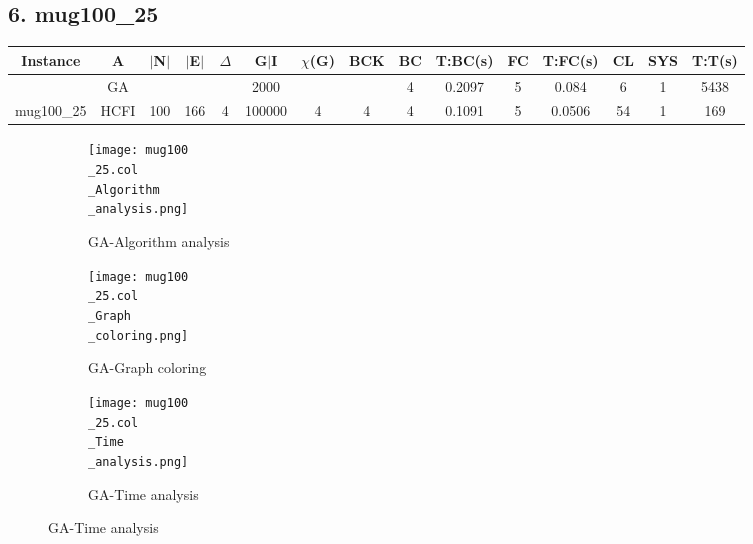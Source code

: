 \documentclass[10pt]{article}
\begin{document}
\subsection*{\hspace{0,9073976cm} 6. mug100\_25}
\begin{table}[H]
\centering
\begin{tabular}{|c|c|c|c|c|c|c|c|c|c|c|c|c|c|c|}
\hline
Instance& A &$|$N$|$ & $|$E$|$ & $\Delta$ & G$|$I & $\chi$(G) &BCK&BC & T:BC(s) & FC & T:FC(s) & CL & SYS & T:T(s) \\ \hline \hline
&GA&       &                   &                     &2000         &     \cellcolor{yellow} & {\cellcolor{yellow}}& {{\cellcolor{green}4}}
&0.2097   &5        &0.084                   & 6                   &1          &5438        \\ \cline{2-2} \cline{6-6} \cline{9-15}
 \multirow{-2}{*}{mug100\_25} &HCFI   &\multirow{-2}{*}{100}   &\multirow{-2}{*}{166}     &\multirow{-2}{*}{4}     &100000     &\multirow{-2}{*}{\cellcolor{yellow}4}      & \multirow{-2}{*}{\cellcolor{yellow}4}    &{\cellcolor{green}4}     &0.1091         &5    &0.0506         &54   &1     &169        \\ \hline 
\end{tabular}
\end{table}

\graphicspath{{./Core1/Solutions/GA/mug100\_25.col}}
\begin{figure}[H]
\begin{subfigure}{.33\textwidth}
  \centering
  \texttt{[image: mug100\\\_25.col\\\_Algorithm\\\_analysis.png]}
  \caption{GA-Algorithm analysis}
   \label{fig:subfig1}
\end{subfigure}%
\begin{subfigure}{.33\textwidth}
  \centering
  \texttt{[image: mug100\\\_25.col\\\_Graph\\\_coloring.png]}
  \caption{GA-Graph coloring}
  \label{fig:subfig2}
\end{subfigure}
\begin{subfigure}{.33\textwidth}
  \centering
  \texttt{[image: mug100\\\_25.col\\\_Time\\\_analysis.png]}
  \caption{GA-Time analysis}
  \end{subfigure}
\end{figure}
\end{document}
